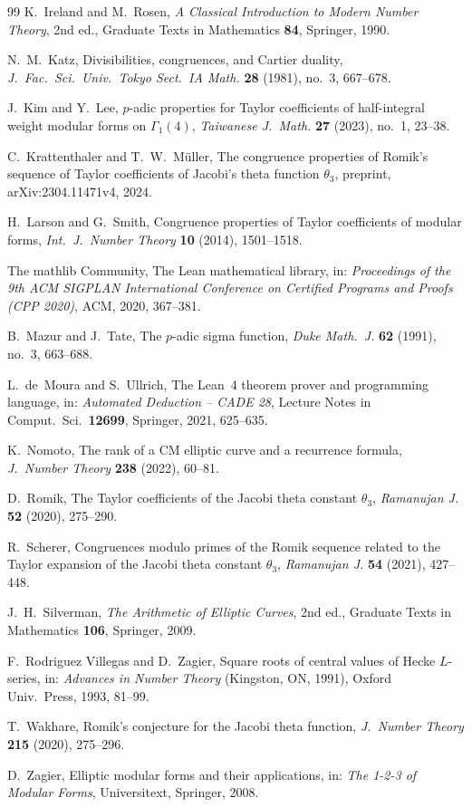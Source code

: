 \documentclass[11pt]{amsart}
\theoremstyle{definition}
\theoremstyle{remark}
\begin{document}
\begin{thebibliography}{99}
 K.~Ireland and M.~Rosen, \emph{A Classical Introduction to Modern Number Theory},
2nd ed., Graduate Texts in Mathematics \textbf{84}, Springer, 1990.

 N.~M.~Katz, Divisibilities, congruences, and Cartier duality, \emph{J.\ Fac.\ Sci.\
Univ.\ Tokyo Sect.\ IA Math.} \textbf{28} (1981), no.~3, 667--678.

 J.~Kim and Y.~Lee, $p$-adic properties for Taylor coefficients of half-integral
weight modular forms on $\Gamma_1(4)$, \emph{Taiwanese J.\ Math.} \textbf{27} (2023), no.~1,
23--38.

 C.~Krattenthaler and T.~W.~M\"uller, The congruence properties of Romik's sequence of
Taylor coefficients of Jacobi's theta function $\theta_3$, preprint, arXiv:2304.11471v4, 2024.

 H.~Larson and G.~Smith, Congruence properties of Taylor coefficients of
modular forms, \emph{Int.\ J.\ Number Theory} \textbf{10} (2014), 1501--1518.

 The mathlib Community, The Lean mathematical library, in: \emph{Proceedings of the
9th ACM SIGPLAN International Conference on Certified Programs and Proofs (CPP 2020)}, ACM, 2020,
367--381.

 B.~Mazur and J.~Tate, The $p$-adic sigma function, \emph{Duke Math.\ J.} \textbf{62}
(1991), no.~3, 663--688.

 L.~de~Moura and S.~Ullrich, The Lean~4 theorem prover and programming language, in:
\emph{Automated Deduction -- CADE 28}, Lecture Notes in Comput.\ Sci.\ \textbf{12699}, Springer,
2021, 625--635.

 K.~Nomoto, The rank of a CM elliptic curve and a recurrence formula,
\emph{J.\ Number Theory} \textbf{238} (2022), 60--81.

 D.~Romik, The Taylor coefficients of the Jacobi theta constant $\theta_3$,
\emph{Ramanujan J.} \textbf{52} (2020), 275--290.

 R.~Scherer, Congruences modulo primes of the Romik sequence related to the Taylor
expansion of the Jacobi theta constant $\theta_3$, \emph{Ramanujan J.} \textbf{54} (2021),
427--448.

 J.~H.~Silverman, \emph{The Arithmetic of Elliptic Curves}, 2nd ed., Graduate
Texts in Mathematics \textbf{106}, Springer, 2009.

 F.~Rodriguez Villegas and D.~Zagier, Square roots of central values of Hecke
$L$-series, in: \emph{Advances in Number Theory} (Kingston, ON, 1991), Oxford Univ.\ Press, 1993,
81--99.

 T.~Wakhare, Romik's conjecture for the Jacobi theta function, \emph{J.\ Number
Theory} \textbf{215} (2020), 275--296.

 D.~Zagier, Elliptic modular forms and their applications, in: \emph{The 1-2-3 of
Modular Forms}, Universitext, Springer, 2008.

\end{thebibliography}
\end{document}

